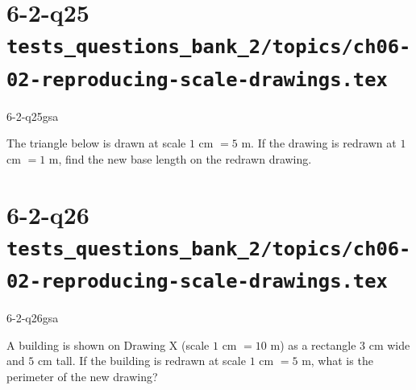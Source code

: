 \documentclass[12pt, fleqn, openany]{studyGuide}
\begin{document}
\newpage
\section*{6-2-q25 \hfill \normalsize\texttt{tests\_questions\_bank\_2/topics/ch06-02-reproducing-scale-drawings.tex}}
\begin{practiceQuestion}{6-2-q25}{gsa}
\begin{questionText}
The triangle below is drawn at scale $1$ cm $= 5$ m. If the drawing is redrawn at $1$ cm $= 1$ m, find the new base length on the redrawn drawing.

\begin{center}
\end{center}
\end{questionText}
\end{practiceQuestion}

\newpage
\section*{6-2-q26 \hfill \normalsize\texttt{tests\_questions\_bank\_2/topics/ch06-02-reproducing-scale-drawings.tex}}
\begin{practiceQuestion}{6-2-q26}{gsa}
\begin{questionText}
A building is shown on Drawing X (scale $1$ cm $= 10$ m) as a rectangle $3$ cm wide and $5$ cm tall. If the building is redrawn at scale $1$ cm $= 5$ m, what is the perimeter of the new drawing?

\begin{center}
\end{center}
\end{questionText}
\end{practiceQuestion}
\end{document}
